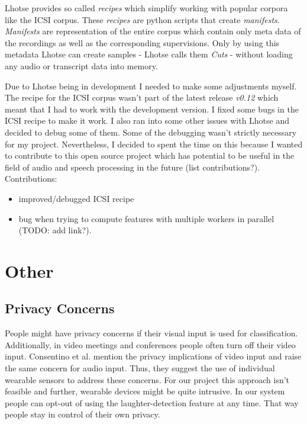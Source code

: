 \documentclass[bsc,frontabs,parskip,deptreport]{infthesis}
\begin{document}
Lhotse provides so called \textit{recipes} which simplify working with popular corpora like the ICSI corpus.
These \textit{recipes} are python scripts that create \textit{manifests}.
\textit{Manifests} are representation of the entire corpus which contain only meta data of the recordings as well as the corresponding supervisions. 
Only by using this metadata Lhotse can create samples - Lhotse calls them \textit{Cuts} - without loading any audio or transcript data into memory. 

Due to Lhotse being in development I needed to make some adjustments myself. The recipe for the ICSI corpus wasn't part of the latest release \textit{v0.12} which meant that I had to work with the development version. I fixed some bugs in the ICSI recipe to make it work. I also ran into some other issues with Lhotse and decided to debug some of them. Some of the debugging wasn't strictly necessary for my project. Nevertheless, I decided to spent the time on this because I wanted to contribute to this open source project which has potential to be useful in the field of audio and speech processing in the future (list contributions?).
Contributions: 
\begin{itemize}
    \item improved/debugged ICSI recipe 
    \item bug when trying to compute features with multiple workers in parallel (TODO: add link?).
\end{itemize}


\chapter{Other}
\section{Privacy Concerns}\label{privacy-concerns}
People might have privacy concerns if their visual input is used for classification.
Additionally, in video meetings and conferences people often turn off their video input.
Consentino et al. \cite{cosentino2016quantitative}  mention the privacy implications of video input and raise the same concern for audio input.
Thus, they suggest the use of individual wearable sensors to address these concerns.
For our project this approach isn't feasible and further, wearable devices might be quite intrusive.
In our system people can opt-out of using the laughter-detection feature at any time.
That way people stay in control of their own privacy.




%
%
%
\end{document}
